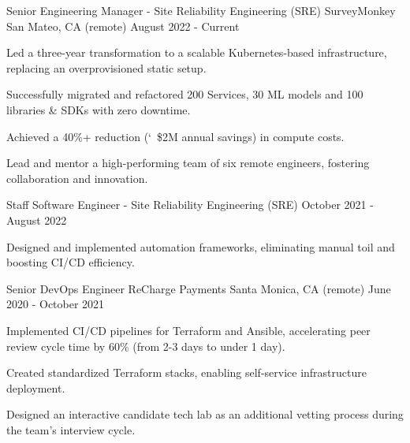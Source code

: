 

\begin{cventries}

  \cventry
    {Senior Engineering Manager - Site Reliability Engineering (SRE)} %
    {SurveyMonkey} %
    {San Mateo, CA  (remote)} %
    {August 2022 - Current} %
    {
      \begin{cvitems} %
        \item {Led a three-year transformation to a scalable Kubernetes-based infrastructure, replacing an overprovisioned static setup.}
        \item {Successfully migrated and refactored 200 Services, 30 ML models and 100 libraries \& SDKs with zero downtime.}
        \item {Achieved a 40\%+ reduction (\char`~\$2M annual savings) in compute costs.}
        \item {Lead and mentor a high-performing team of six remote engineers, fostering collaboration and innovation.}
      \end{cvitems}
    }

  \cventry
    {Staff Software Engineer - Site Reliability Engineering (SRE)} %
    {} %
    {} %
    {October 2021 - August 2022} %
    {
      \begin{cvitems}
        \item {Designed and implemented automation frameworks, eliminating manual toil and boosting CI/CD efficiency.}
      \end{cvitems}
    }

  \cventry
  {Senior DevOps Engineer} %
  {ReCharge Payments} %
  {Santa Monica, CA (remote)} %
  {June 2020 - October 2021} %
  { 
    \begin{cvitems} %
      \item {Implemented CI/CD pipelines for Terraform and Ansible, accelerating peer review cycle time by 60\% (from 2-3 days to under 1 day).}
      \item {Created standardized Terraform stacks, enabling self-service infrastructure deployment.}
      \item {Designed an interactive candidate tech lab as an additional vetting process during the team's interview cycle.}
    \end{cvitems}
  }


\end{cventries}
